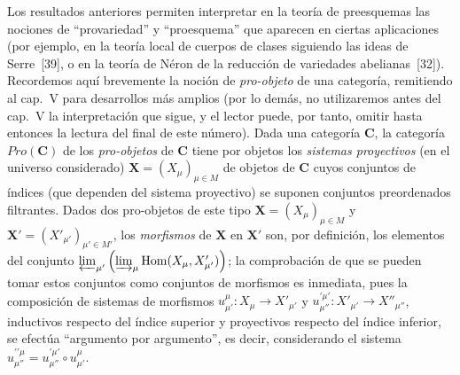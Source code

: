 \begin{env}[8.13.3]
\label{IV.8.13.3-fr}
Los resultados anteriores permiten interpretar en la teoría de preesquemas las nociones de ``provariedad'' y ``proesquema'' que aparecen en ciertas aplicaciones (por ejemplo, en la teoría local de cuerpos de clases siguiendo las ideas de Serre~[39], o en la teoría de N\'eron de la reducción de
variedades abelianas~[32]).
Recordemos aquí brevemente la noción de \emph{pro-objeto} de una categoría, remitiendo al cap.~V para desarrollos más amplios (por lo demás, no utilizaremos antes del cap.~V la interpretación que sigue, y el lector puede, por tanto, omitir hasta entonces la lectura del final de este número).
Dada una categoría $\boldsymbol{C}$, la categoría $\boldsymbol{\mathit{Pro}}(\boldsymbol{C})$ de los \emph{pro-objetos} de $\boldsymbol{C}$ tiene por objetos los \emph{sistemas proyectivos} (en el universo considerado) $\mathbf X=(X_\mu)_{\mu\in M}$ de objetos de $\boldsymbol{C}$ cuyos conjuntos de índices (que dependen del sistema proyectivo) se suponen conjuntos preordenados filtrantes.
Dados dos pro-objetos de este tipo $\mathbf X=(X_\mu)_{\mu\in M}$ y $\mathbf X'=(X'_{\mu'})_{\mu'\in M'}$, los \emph{morfismos} de $\mathbf X$ en $\mathbf X'$ son, por definición, los elementos del conjunto $\varprojlim_{\mu'}\left(\varinjlim_\mu
\operatorname{Hom}(X_\mu,X'_{\mu'})\right)$; la comprobación de que se pueden tomar estos conjuntos como conjuntos de morfismos es inmediata, pues la composición de sistemas de morfismos $u_{\mu'}^\mu:X_\mu\to X'_{\mu'}$ y $u_{\mu''}^{\prime\mu'}:X'_{\mu'}\to X''_{\mu''}$, inductivos respecto del índice superior y proyectivos respecto del índice inferior, se efectúa ``argumento por argumento'', es decir, considerando el sistema $u_{\mu''}^{\prime\prime\mu}=u_{\mu''}^{\prime\mu'}\circ u_{\mu'}^\mu$.
\end{env}

